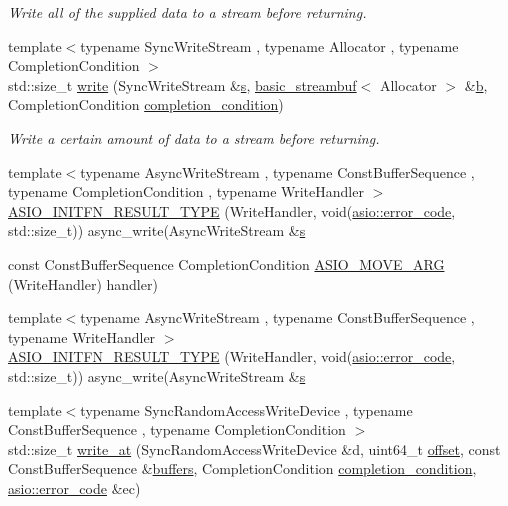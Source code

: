 \begin{DoxyCompactItemize}
\begin{DoxyCompactList}\small\item\em Write all of the supplied data to a stream before returning. \end{DoxyCompactList}\item 
{\footnotesize template$<$typename Sync\+Write\+Stream , typename Allocator , typename Completion\+Condition $>$ }\\std\+::size\+\_\+t \hyperlink{group__write_gaa80988391fb309ee53cc557d0065550a}{write} (Sync\+Write\+Stream \&\hyperlink{group__async__connect_ga31ab74b9ea6c77932dddd016cfc7920a}{s}, \hyperlink{classasio_1_1basic__streambuf}{basic\+\_\+streambuf}$<$ Allocator $>$ \&\hyperlink{group__async__read_ga945a5c18fa77a9e2eba420f8f44b2a4f}{b}, Completion\+Condition \hyperlink{group__async__read_gae2e215d5013596cc2b385bb6c13fa518}{completion\+\_\+condition})
\begin{DoxyCompactList}\small\item\em Write a certain amount of data to a stream before returning. \end{DoxyCompactList}\item 
{\footnotesize template$<$typename Async\+Write\+Stream , typename Const\+Buffer\+Sequence , typename Completion\+Condition , typename Write\+Handler $>$ }\\\hyperlink{group__async__write_ga5a1e5b963aeb45f6fc692c4e1a07ed04}{A\+S\+I\+O\+\_\+\+I\+N\+I\+T\+F\+N\+\_\+\+R\+E\+S\+U\+L\+T\+\_\+\+T\+Y\+P\+E} (Write\+Handler, void(\hyperlink{classasio_1_1error__code}{asio\+::error\+\_\+code}, std\+::size\+\_\+t)) async\+\_\+write(Async\+Write\+Stream \&\hyperlink{group__async__connect_ga31ab74b9ea6c77932dddd016cfc7920a}{s}
\item 
const Const\+Buffer\+Sequence Completion\+Condition \hyperlink{group__async__write_ga9600cc9bb72a930568b318a8d6f79afa}{A\+S\+I\+O\+\_\+\+M\+O\+V\+E\+\_\+\+A\+R\+G} (Write\+Handler) handler)
\item 
{\footnotesize template$<$typename Async\+Write\+Stream , typename Const\+Buffer\+Sequence , typename Write\+Handler $>$ }\\\hyperlink{group__async__write_ga7b61e40209cec169c7de5fafc16a6f9c}{A\+S\+I\+O\+\_\+\+I\+N\+I\+T\+F\+N\+\_\+\+R\+E\+S\+U\+L\+T\+\_\+\+T\+Y\+P\+E} (Write\+Handler, void(\hyperlink{classasio_1_1error__code}{asio\+::error\+\_\+code}, std\+::size\+\_\+t)) async\+\_\+write(Async\+Write\+Stream \&\hyperlink{group__async__connect_ga31ab74b9ea6c77932dddd016cfc7920a}{s}
\item 
{\footnotesize template$<$typename Sync\+Random\+Access\+Write\+Device , typename Const\+Buffer\+Sequence , typename Completion\+Condition $>$ }\\std\+::size\+\_\+t \hyperlink{group__write__at_ga51133c1e260b8abeeed55646e765fdd6}{write\+\_\+at} (Sync\+Random\+Access\+Write\+Device \&d, uint64\+\_\+t \hyperlink{group__async__read__at_ga8dcdb41a4adfd6fe5322b5dd666d9f29}{offset}, const Const\+Buffer\+Sequence \&\hyperlink{group__async__read_ga54dede45c3175148a77fe6635222c47d}{buffers}, Completion\+Condition \hyperlink{group__async__read_gae2e215d5013596cc2b385bb6c13fa518}{completion\+\_\+condition}, \hyperlink{classasio_1_1error__code}{asio\+::error\+\_\+code} \&ec)

\end{DoxyCompactItemize}
